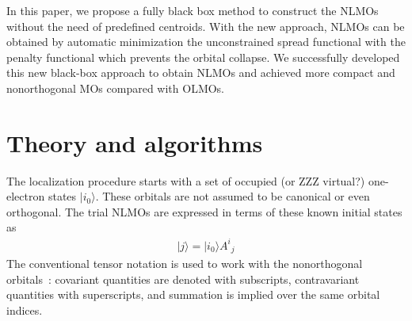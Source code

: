 \documentclass[aps,prl,reprint,amsmath,amssymb]{revtex4-1}
\newcommand{\ket}[1]{\ensuremath{\vert #1 \rangle}}
\begin{document}
In this paper, we propose a fully black box method to construct the NLMOs without the need of predefined centroids.
With the new approach, NLMOs can be obtained by automatic minimization the unconstrained spread functional with the  penalty functional which prevents the orbital collapse.
We successfully developed this new black-box approach to obtain NLMOs and achieved more compact and nonorthogonal MOs compared with OLMOs.

\section{Theory and algorithms}

The localization procedure starts with a set of occupied (or ZZZ virtual?) one-electron states $\ket{i_0}$. These orbitals are not assumed to be canonical or even orthogonal. The trial NLMOs are expressed in terms of these known initial states as
%
\begin{equation}
\begin{split}
\ket{j} = \ket{i_0} {A^i}_j  
\end{split}
\end{equation}
%
The conventional tensor notation is used to work with the nonorthogonal orbitals~\cite{head1998tensor}: covariant quantities are denoted with subscripts, contravariant quantities with superscripts, and summation is implied over the same orbital indices.
\end{document}
